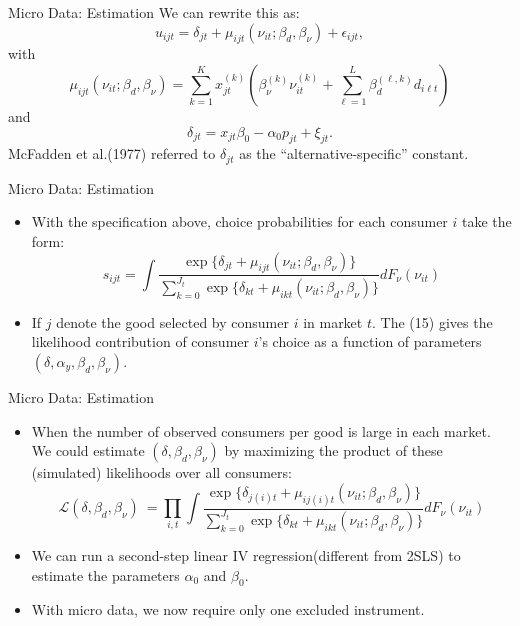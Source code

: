 \documentclass[aspectratio=169]{beamer}  %
\begin{document}
\begin{frame}{Micro Data: Estimation} 
    We can rewrite this as:
    \begin{equation}
        u_{ijt} = \delta_{jt} + \mu_{ijt}(\nu_{it}; \beta_d, \beta_\nu) + \epsilon_{ijt},
    \end{equation}
    with
    \begin{equation}
        \mu_{ijt}(\nu_{it}; \beta_d, \beta_\nu) = \sum_{k=1}^K x_{jt}^{(k)} \left( \beta_\nu^{(k)} \nu_{it}^{(k)} + \sum_{\ell=1}^L \beta_d^{(\ell, k)} d_{i\ell t} \right)
    \end{equation}
    and
    \begin{equation}
        \delta_{jt} = x_{jt} \beta_0 - \alpha_0 p_{jt} + \xi_{jt}.
    \end{equation}
    McFadden et al.(1977) referred to  \(\delta_{jt}\) as the “alternative-specific” constant.
\end{frame}

\begin{frame}{Micro Data: Estimation}  
    \begin{itemize}
    \item With the specification above, choice probabilities for each consumer \(i\) take the form:
    \begin{equation}
        s_{ijt} = \int \frac{\exp\{\delta_{jt} + \mu_{ijt}(\nu_{it}; \beta_d, \beta_\nu)\}}{\sum_{k=0}^{J_t} \exp\{\delta_{kt} + \mu_{ikt}(\nu_{it}; \beta_d, \beta_\nu)\}} dF_{\nu}(\nu_{it})
    \end{equation}
    \item If \(j\) denote the good selected by consumer \(i\) in market \(t\). The (15) gives the likelihood contribution of consumer \(i\)'s choice as a function of parameters \((\delta, \alpha_y, \beta_d, \beta_\nu)\).
    \end{itemize}
\end{frame}

\begin{frame}{Micro Data: Estimation} 
    \begin{itemize}
    \item 
    When the number of observed consumers per good is large in each market. We could estimate \((\delta, \beta_d, \beta_\nu)\) by maximizing the product of these (simulated) likelihoods over all consumers:
    \begin{equation}
        \mathcal{L}(\delta, \beta_d, \beta_\nu)\ = \prod_{i, t} \int \frac{\exp\{\delta_{j(i)t} + \mu_{ij(i)t}(\nu_{it}; \beta_d, \beta_\nu)\}}{\sum_{k=0}^{J_t} \exp\{\delta_{kt} + \mu_{ikt}(\nu_{it}; \beta_d, \beta_\nu)\}} dF_\nu(\nu_{it})
    \end{equation}
    \item We can run a second-step linear IV regression(different from 2SLS) to estimate the parameters \(\alpha_0 \) and \(\beta_0\).
    \item With micro data, we now require only one excluded instrument.
    \end{itemize}
\end{frame}
\end{document}
